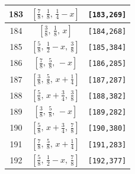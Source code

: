 \documentclass[fleqn,8pt]{jsarticle}
\begin{document}
\begin{longtable}{ccc}
183 & $\left[ \frac{7}{8},\, \frac{1}{8},\, \frac{1}{4} - x \right]$ & {\tt [183,269]} \\ \hline
184 & $\left[ \frac{3}{8},\, \frac{1}{8},\, x \right]$ & {\tt [184,268]} \\ \hline
185 & $\left[ \frac{5}{8},\, \frac{1}{2} - x,\, \frac{3}{8} \right]$ & {\tt [185,384]} \\ \hline
186 & $\left[ \frac{7}{8},\, \frac{5}{8},\, - x \right]$ & {\tt [186,285]} \\ \hline
187 & $\left[ \frac{3}{8},\, \frac{5}{8},\, x + \frac{1}{4} \right]$ & {\tt [187,287]} \\ \hline
188 & $\left[ \frac{5}{8},\, x + \frac{3}{4},\, \frac{3}{8} \right]$ & {\tt [188,382]} \\ \hline
189 & $\left[ \frac{3}{8},\, \frac{5}{8},\, - x \right]$ & {\tt [189,282]} \\ \hline
190 & $\left[ \frac{5}{8},\, x + \frac{3}{4},\, \frac{7}{8} \right]$ & {\tt [190,380]} \\ \hline
191 & $\left[ \frac{7}{8},\, \frac{5}{8},\, x + \frac{1}{4} \right]$ & {\tt [191,283]} \\ \hline
192 & $\left[ \frac{5}{8},\, \frac{1}{2} - x,\, \frac{7}{8} \right]$ & {\tt [192,377]} \\
\end{longtable}
\renewcommand{\arraystretch}{1.2}
\end{document}
